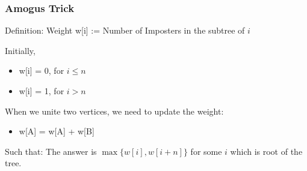\begin{frame}
\frametitle{Amogus Trick}

\begin{block}{Definition: Weight}
  w[i] := Number of Imposters in the subtree of $i$
\end{block}

Initially,

\begin{itemize}
  \item w[i] = 0, for $i \le n$
  \item w[i] = 1, for $i > n$
\end{itemize}

When we unite two vertices, we need to update the weight:
\begin{itemize}
  \item w[A] = w[A] + w[B]
\end{itemize}

\medskip

Such that: The answer is $\max\{w[i], w[i + n]\}$ for some $i$ which is root of the tree.

\end{frame}